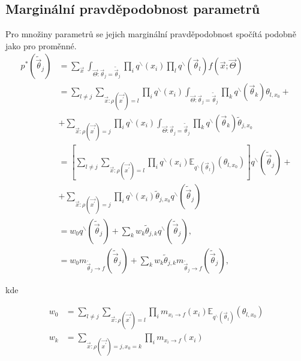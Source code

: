 \subsection{Marginální pravděpodobnost parametrů}

Pro množiny parametrů se jejich marginální pravděpodobnost spočítá podobně jako
pro proměnné.
\begin{align}
p^*(\tilde{\vec{\theta}}_j) & = \sum_{\vec{x}} \int_{\vec{\Theta}:
    \vec{\theta}_j = \tilde{\vec{\theta}}_j} \prod_i q^\backslash(x_i) \prod_l
    q^\backslash(\vec{\theta}_l) f(\vec{x}; \vec{\Theta}) \label{eq:ep:theta_1}
\\
& = \sum_{l \ne j} \sum_{\vec{x}: \rho(\vec{x^\prime}) = l} \prod_i
    q^\backslash(x_i) \int_{\vec{\Theta}: \vec{\theta}_j =
    \tilde{\vec{\theta}}_j} \prod_k q^\backslash(\vec{\theta}_k) \theta_{l,
    x_0} + \label{eq:ep:theta_2}
\\
&   + \sum_{\vec{x}: \rho(\vec{x^\prime}) = j} \prod_i q^\backslash(x_i)
    \int_{\vec{\Theta}: \vec{\theta}_j = \tilde{\vec{\theta}}_j} \prod_k
    q^\backslash(\vec{\theta}_k) \tilde{\theta}_{j, x_0}
\nonumber
\\
& = \left[ \sum_{l \ne j} \sum_{\vec{x}: \rho(\vec{x^\prime}) = l} \prod_i
    q^\backslash(x_i) \mathbb{E}_{q^\backslash(\vec{\theta}_l)} (\theta_{l,
    x_0}) \right] q^\backslash(\tilde{\vec{\theta}}_j) + \label{eq:ep:theta_3}
\\
&   + \sum_{\vec{x}: \rho(\vec{x^\prime}) = j} \prod_i q^\backslash(x_i)
    \tilde{\theta}_{j,x_0} q^\backslash(\tilde{\vec{\theta}}_j)
\label{eq:ep:theta_4}
\nonumber
\\
& = w_0 q^\backslash(\tilde{\vec{\theta}}_j) + \sum_k w_k
    \tilde{\theta}_{j,k} q^\backslash(\tilde{\vec{\theta}}_j),
\\
& = w_0 m_{\tilde{\vec\theta}_j \rightarrow f}(\tilde{\vec{\theta}}_j) + \sum_k w_k
    \tilde{\theta}_{j,k} m_{\tilde{\vec\theta}_j \rightarrow f}(\tilde{\vec{\theta}}_j),
\end{align}

kde

\begin{align}
w_0 &=
	\sum_{l \ne j} 
		\sum_{\vec{x}: \rho(\vec{x^\prime}) = l} 
			\prod_i
 				m_{x_i \rightarrow f}(x_i)
				\mathbb{E}_{q^\backslash(\vec{\theta}_l)} (
					\theta_{l,
					x_0}) 
\\
w_k &=
	\sum_{\vec{x}: \rho(\vec{x^\prime}) = j, x_0 = k} 
		\prod_i
			m_{x_i \rightarrow f}(x_i)		
\end{align}

